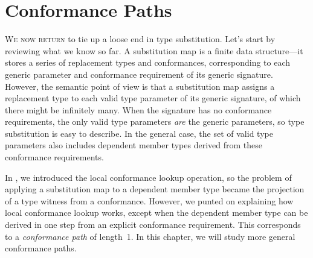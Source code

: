 \documentclass[../generics]{subfiles}
\begin{document}
\newcommand{\NormalConformance}[3]{
\begin{tabularx}{\textwidth}{lcX}
\toprule
$\clubsuit\;\ConfReq{#1}{#2}$\\
\midrule
#3
\end{tabularx}}
\newcommand{\AssocTypeDef}[3]{$\AssocType{#1}{#2}$&$\mapsto$&\texttt{#3}}
\newcommand{\AssocConfDef}[3]{$\AssocConf{#1}{#3}$&$\mapsto$&\ConfReq{#2}{#3}}

\newcommand{\StringCollection}{\ConfReq{String}{Collection}}
\newcommand{\SubstringCollection}{\ConfReq{Substring}{Collection}}
\newcommand{\StringSequence}{\ConfReq{String}{Sequence}}
\newcommand{\SubstringSequence}{\ConfReq{Substring}{Sequence}}

\newcommand{\TauN}{\ConfReq{$\uptau$}{N}}

\newcommand{\TPOne}{\ConfReq{$\tT_1$}{$\tP_1$}}

\newcommand{\XN}{\ConfReq{X}{N}}

\newcommand{\SN}{\ConfReq{S}{N}}
\newcommand{\FN}{\ConfReq{F<$\uptau$>}{N}}
\newcommand{\HN}{\ConfReq{H<$\uptau$>}{N}}

\newcommand{\SigmaS}{\Sigma_\texttt{S}}
\newcommand{\SigmaF}{\Sigma_\texttt{F}}

\newcommand{\SelfAToN}{\AssocConf{Self.A}{N}}

\chapter{Conformance Paths}\label{conformance paths}

\lettrine{W}{e now return} to tie up a loose end in type substitution. Let's start by reviewing what we know so far. A substitution map is a finite data structure---it stores a series of replacement types and conformances, corresponding to each generic parameter and conformance requirement of its generic signature. However, the semantic point of view is that a substitution map assigns a replacement type to each valid type parameter of its generic signature, of which there might be infinitely many. When the signature has no conformance requirements, the only valid type parameters \emph{are} the generic parameters, so type substitution is easy to describe. In the general case, the set of valid type parameters also includes dependent member types derived from these conformance requirements.

In , we introduced the local conformance lookup operation, so the problem of applying a substitution map to a dependent member type became the projection of a type witness from a conformance. However, we punted on explaining how local conformance lookup works, except when the dependent member type can be derived in one step from an explicit conformance requirement. This corresponds to a \emph{conformance path} of length~1. In this chapter, we will study more general conformance paths.
\end{document}
